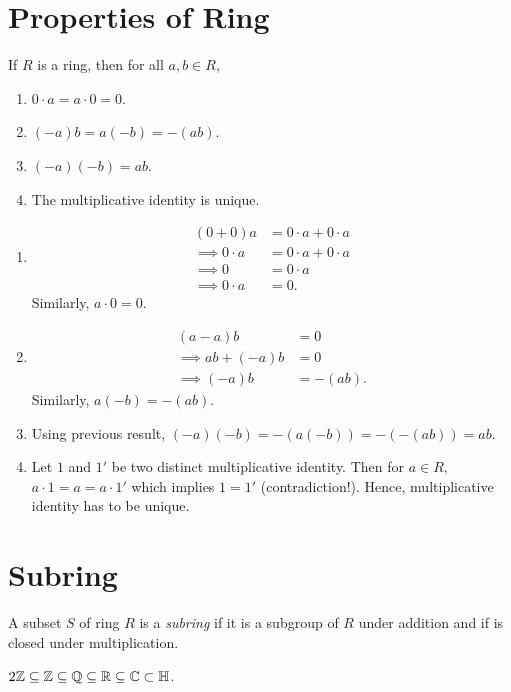 \section{Properties of Ring}
\begin{prop} If $R$ is a ring, then for all $a, b \in R$,
    \begin{enumerate}
        \item $0\cdot a = a \cdot 0 = 0$.
        \item $(-a)b = a(-b) = -(ab)$.
        \item $(-a)(-b) = ab$.
        \item The multiplicative identity is unique.
    \end{enumerate}
\end{prop}
\begin{propproof}
    \begin{enumerate}
        \item \begin{align*}
            (0 + 0) a &= 0\cdot a + 0 \cdot a\\
            \implies 0 \cdot a &= 0\cdot a + 0 \cdot a\\
            \implies 0 &= 0 \cdot a\\
            \implies 0 \cdot a &= 0.
        \end{align*}
        Similarly, $a \cdot 0 = 0$.
        \item \begin{align*}
            (a - a) b &= 0\\
            \implies ab + (-a)b&= 0\\
            \implies (-a)b &= -(ab).
        \end{align*}
        Similarly, $a(-b) = -(ab)$.
        \item Using previous result, $(-a)(-b) = -(a(-b)) = -(-(ab)) = ab.$
        \item Let $1$ and $1'$ be two distinct multiplicative identity. Then for $a \in R$, $a \cdot 1 = a = a \cdot 1'$ which implies $1 = 1'$ (contradiction!). Hence, multiplicative identity has to be unique.
    \end{enumerate}
\end{propproof}
\section{Subring}
\begin{definition}[Subring]
    A subset $S$ of ring $R$ is a \textit{subring} if it is a subgroup of $R$ under addition and if is closed under multiplication.
\end{definition}
\begin{eg}
    $2\mathbb{Z} \subseteq \mathbb{Z} \subseteq \mathbb{Q} \subseteq \mathbb{R} \subseteq \mathbb{C} \subset \mathbb{H}$.
\end{eg}
